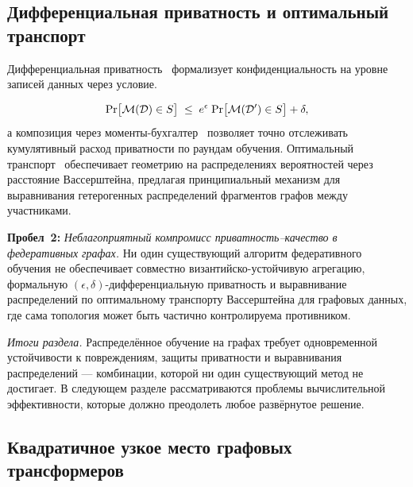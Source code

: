 \subsection{Дифференциальная приватность и оптимальный транспорт}

Дифференциальная приватность~\cite{Dwork2006} формализует конфиденциальность на уровне записей данных через условие.

\begin{equation}
\mathrm{Pr}\bigl[\mathcal{M}(\mathcal{D})\in S\bigr]
\;\le\;
e^{\epsilon}\;\mathrm{Pr}\bigl[\mathcal{M}(\mathcal{D}')\in S\bigr] + \delta,
\end{equation}а композиция через моменты-бухгалтер~\cite{Abadi2016} позволяет точно отслеживать кумулятивный расход приватности по раундам обучения. Оптимальный транспорт~\cite{Villani2009,Cuturi2013} обеспечивает геометрию на распределениях вероятностей через расстояние Вассерштейна, предлагая принципиальный механизм для выравнивания гетерогенных распределений фрагментов графов между участниками.

\medskip
\noindent\textbf{Пробел~2:} \emph{Неблагоприятный компромисс приватность--качество в федеративных графах.} Ни один существующий алгоритм федеративного обучения не обеспечивает совместно византийско-устойчивую агрегацию, формальную $(\epsilon,\delta)$-дифференциальную приватность и выравнивание распределений по оптимальному транспорту Вассерштейна для графовых данных, где сама топология может быть частично контролируема противником.

\medskip
\noindent\textit{Итоги раздела.} Распределённое обучение на графах требует одновременной устойчивости к повреждениям, защиты приватности и выравнивания распределений --- комбинации, которой ни один существующий метод не достигает. В следующем разделе рассматриваются проблемы вычислительной эффективности, которые должно преодолеть любое развёрнутое решение.

\label{sec:efficiency}%

\subsection{Квадратичное узкое место графовых трансформеров}

